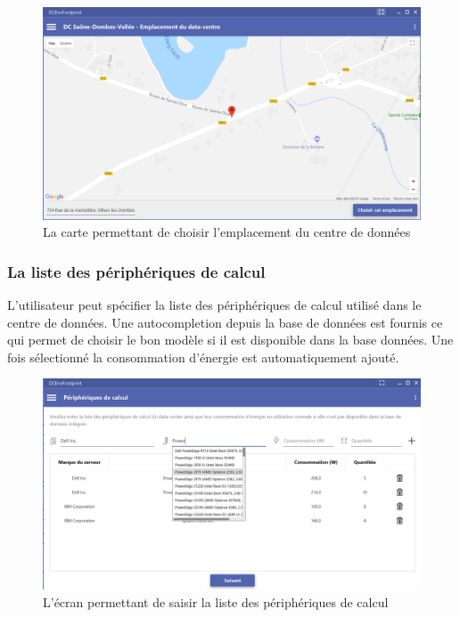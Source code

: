 \begin{figure}[h!]
	\begin{center}
		\includegraphics[scale=0.50]{partie3/images/carte.png}
		\caption{La carte permettant de choisir l'emplacement du centre de données}
	\end{center}
\end{figure}
\newpage
\subsubsection{La liste des périphériques de calcul}
L'utilisateur peut spécifier la liste des périphériques de calcul utilisé dans le centre de données. Une autocompletion depuis la base de données est fournis ce qui permet de choisir le bon modèle si il est disponible dans la base données. Une fois sélectionné la consommation d'énergie est automatiquement ajouté.

\begin{figure}[h!]
	\begin{center}
		\includegraphics[scale=0.4]{partie3/images/calculation.png}
		\caption{L'écran permettant de saisir la liste des périphériques de calcul}
	\end{center}
\end{figure}

